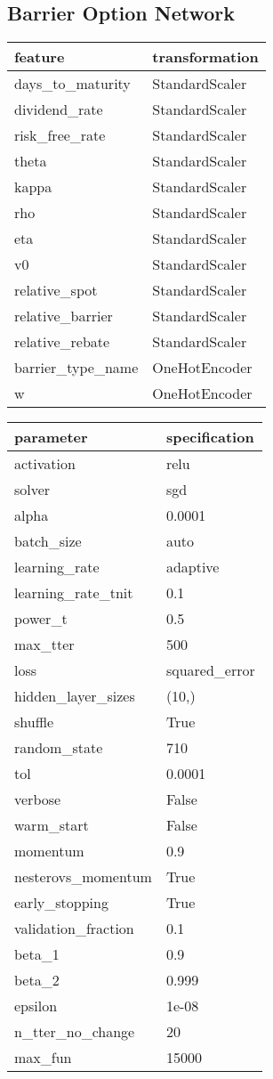 \begin{minipage}{0.45\textwidth}
	\subsection{Barrier Option Network}
	\label{sections:barrierNet}
	\centering
	\begin{tabular}{ll}
		\toprule
		feature & transformation \\
		\midrule
		days_to_maturity & StandardScaler \\
		dividend_rate & StandardScaler \\
		risk_free_rate & StandardScaler \\
		theta & StandardScaler \\
		kappa & StandardScaler \\
		rho & StandardScaler \\
		eta & StandardScaler \\
		v0 & StandardScaler \\
		relative_spot & StandardScaler \\
		relative_barrier & StandardScaler \\
		relative_rebate & StandardScaler \\
		barrier_type_name & OneHotEncoder \\
		w & OneHotEncoder \\
		\bottomrule
	\end{tabular}
	\vspace{0.5em}
	
	\begin{tabular}{ll}
		\toprule
		parameter & specification \\
		\midrule
		activation & relu \\
		solver & sgd \\
		alpha & 0.0001 \\
		batch_size & auto \\
		learning_rate & adaptive \\
		learning_rate_{t}nit & 0.1 \\
		power_t & 0.5 \\
		max_{t}ter & 500 \\
		loss & squared_error \\
		hidden_layer_sizes & (10,) \\
		shuffle & True \\
		random_state & 710 \\
		tol & 0.0001 \\
		verbose & False \\
		warm_start & False \\
		momentum & 0.9 \\
		nesterovs_momentum & True \\
		early_stopping & True \\
		validation_fraction & 0.1 \\
		beta_1 & 0.9 \\
		beta_2 & 0.999 \\
		epsilon & 1e-08 \\
		n_{t}ter_no_change & 20 \\
		max_fun & 15000 \\
		\bottomrule
	\end{tabular}
\end{minipage}
